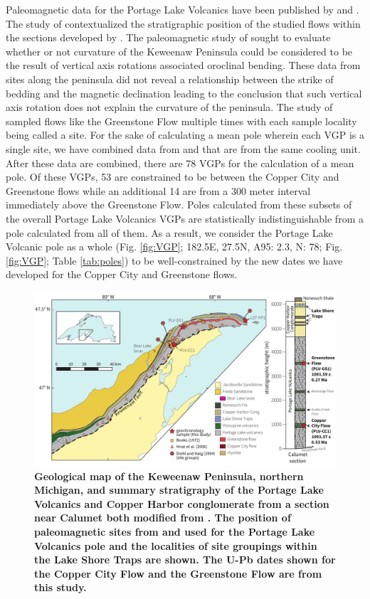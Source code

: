 \documentclass[11pt,letterpaper]{article}
\begin{document}
Paleomagnetic data for the Portage Lake Volcanics have been published by \cite{Books1972a} and \cite{Hnat2006a}. The study of \cite{Books1972a} contextualized the stratigraphic position of the studied flows within the sections developed by \cite{White1953a}. The paleomagnetic study of \cite{Hnat2006a} sought to evaluate whether or not curvature of the Keweenaw Peninsula could be considered to be the result of vertical axis rotations associated oroclinal bending. These data from sites along the peninsula did not reveal a relationship between the strike of bedding and the magnetic declination leading to the conclusion that such vertical axis rotation does not explain the curvature of the peninsula. The study of \cite{Books1972a} sampled flows like the Greenstone Flow multiple times with each sample locality being called a site. For the sake of calculating a mean pole wherein each VGP is a single site, we have combined data from \cite{Books1972a} and \cite{Hnat2006a} that are from the same cooling unit. After these data are combined, there are 78 VGPs for the calculation of a mean pole. Of these VGPs, 53 are constrained to be between the Copper City and Greenstone flows while an additional 14 are from a 300 meter interval immediately above the Greenstone Flow. Poles calculated from these subsets of the overall Portage Lake Volcanics VGPs are statistically indistinguishable from a pole calculated from all of them. As a result, we consider the Portage Lake Volcanic pole as a whole (Fig. \ref{fig:VGP}; 182.5\textdegree E, 27.5\textdegree N, A95: 2.3\textdegree, N: 78; Fig. \ref{fig:VGP}; Table \ref{tab:poles}) to be well-constrained by the new dates we have developed for the Copper City and Greenstone flows.

\begin{figure}[!h]
\centering
\includegraphics[width=6.5 in]{Figures/Fig7_PLV_map.pdf}
\caption{\small{\textbf{Geological map of the Keweenaw Peninsula, northern Michigan, and summary stratigraphy of the Portage Lake Volcanics and Copper Harbor conglomerate from a section near Calumet both modified from \cite{Cannon2001a}. The position of paleomagnetic sites from \cite{Books1972a} and \cite{Hnat2006a} used for the Portage Lake Volcanics pole and the localities of \cite{Diehl1994a} site groupings within the Lake Shore Traps are shown. The U-Pb dates shown for the Copper City Flow and the Greenstone Flow are from this study.}}}
\label{fig:PLV_Map}
\end{figure}
\end{document}
